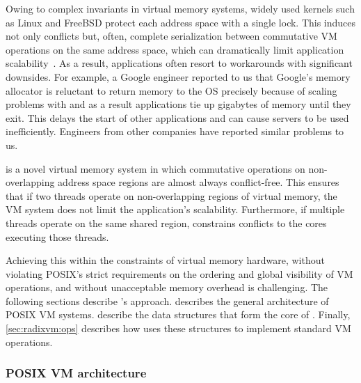 Owing to complex invariants in virtual memory systems,
widely used kernels such as Linux and FreeBSD protect each address
space with a single lock.  This induces not only conflicts but, often,
complete serialization between commutative VM operations on the same
address space, which can dramatically limit application
scalability~\cite{boyd-wickizer:scaling,clements:bonsai}.
%
As a result, applications often resort to workarounds with significant
downsides.
%
For example, a Google engineer reported to us that Google's memory
allocator is reluctant to return memory to the OS precisely because of
scaling problems with  and as a result applications tie
up gigabytes of memory until they exit.
%
This delays the start of other applications and can cause servers to
be used inefficiently.
%
Engineers from other companies have reported similar problems to us.

\vm is a novel virtual memory system in which commutative operations
on non-overlapping address space regions are almost always
conflict-free.  This ensures that if two threads operate on
non-overlapping
regions of virtual memory, the VM system does not limit the
application's scalability.  Furthermore, if multiple threads operate
on the same shared region, \vm constrains conflicts to the cores
executing those threads.

Achieving this within the constraints of virtual memory hardware,
without violating POSIX's strict requirements on the ordering and
global visibility of VM operations, and without unacceptable memory
overhead is challenging.  The following sections describe \vm's
approach.   describes the general architecture
of POSIX VM systems.   describe
the data structures that form the core of \vm.  Finally,
\cref{sec:radixvm:ops} describes how \vm uses these structures to
implement standard VM operations.

\subsubsection{POSIX VM architecture}
\label{sec:radixvm:arch}

